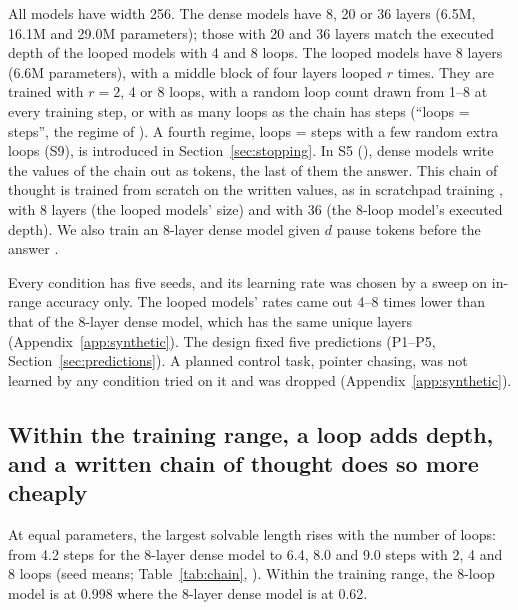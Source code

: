 All models have width 256. The dense models have 8, 20 or 36 layers (6.5M, 16.1M and 29.0M parameters); those with 20
and 36 layers match the executed depth of the looped models with 4 and 8 loops. The looped models have 8 layers (6.6M
parameters), with a middle block of four layers looped $r$ times. They are trained with $r = 2$, 4 or 8 loops, with a
random loop count drawn from 1--8 at every training step, or with as many loops as the chain has steps (``loops =
steps'', the regime of \citealp{fan2025looped}). A fourth regime, loops = steps with a few random extra loops (S9), is
introduced in Section~\ref{sec:stopping}. In S5 (), dense models write the values of the chain out
as tokens, the last of them the answer. This chain of thought \citep{wei2022chain} is trained from scratch on the
written values, as in scratchpad training \citep{nye2021show}, with 8 layers (the looped models' size) and with 36 (the
8-loop model's executed depth). We also train an 8-layer dense model given $d$ pause tokens before the answer
\citep{goyal2024think}.

Every condition has five seeds, and its learning rate was chosen by a sweep on in-range accuracy only. The looped
models' rates came out 4--8 times lower than that of the 8-layer dense model, which has the same unique layers
(Appendix~\ref{app:synthetic}). The design fixed five predictions (P1--P5, Section~\ref{sec:predictions}). A planned
control task, pointer chasing, was not learned by any condition tried on it and was dropped
(Appendix~\ref{app:synthetic}).

\subsection{Within the training range, a loop adds depth, and a written chain of thought does so more cheaply}
\label{sec:inrange}

At equal parameters, the largest solvable length rises with the number of loops: from 4.2 steps for the 8-layer dense
model to 6.4, 8.0 and 9.0 steps with 2, 4 and 8 loops (seed means; Table~\ref{tab:chain}, ). Within
the training range, the 8-loop model is at 0.998 where the 8-layer dense model is at 0.62.

